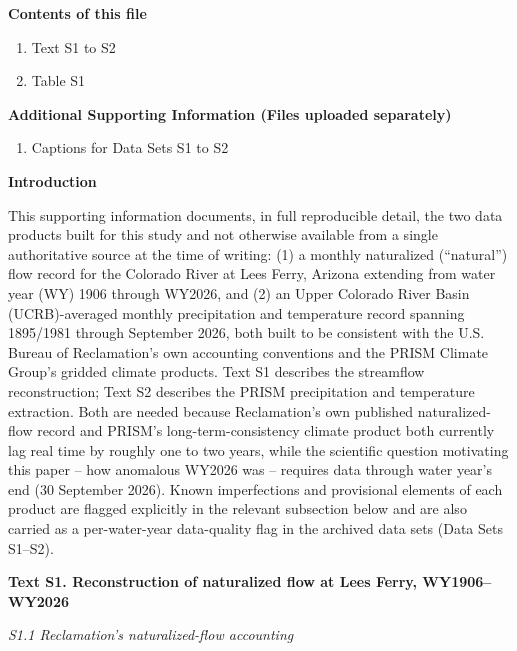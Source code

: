 \documentclass[draft,grl]{agutexSI2019}
\begin{document}
\begin{article}

%
%

\noindent\textbf{Contents of this file}
\begin{enumerate}
\item Text S1 to S2
\item Table S1
\end{enumerate}
\noindent\textbf{Additional Supporting Information (Files uploaded separately)}
\begin{enumerate}
\item Captions for Data Sets S1 to S2
\end{enumerate}

\noindent\textbf{Introduction}

This supporting information documents, in full reproducible detail, the two data products built for this study and not otherwise available from a single authoritative source at the time of writing: (1) a monthly naturalized (``natural'') flow record for the Colorado River at Lees Ferry, Arizona extending from water year (WY) 1906 through WY2026, and (2) an Upper Colorado River Basin (UCRB)-averaged monthly precipitation and temperature record spanning 1895/1981 through September 2026, both built to be consistent with the U.S. Bureau of Reclamation's own accounting conventions and the PRISM Climate Group's gridded climate products. Text S1 describes the streamflow reconstruction; Text S2 describes the PRISM precipitation and temperature extraction. Both are needed because Reclamation's own published naturalized-flow record and PRISM's long-term-consistency climate product both currently lag real time by roughly one to two years, while the scientific question motivating this paper -- how anomalous WY2026 was -- requires data through water year's end (30 September 2026). Known imperfections and provisional elements of each product are flagged explicitly in the relevant subsection below and are also carried as a per-water-year data-quality flag in the archived data sets (Data Sets S1--S2).


\noindent\textbf{Text S1. Reconstruction of naturalized flow at Lees Ferry, WY1906--WY2026}

\noindent\textit{S1.1 Reclamation's naturalized-flow accounting}


\end{article}
\end{document}
